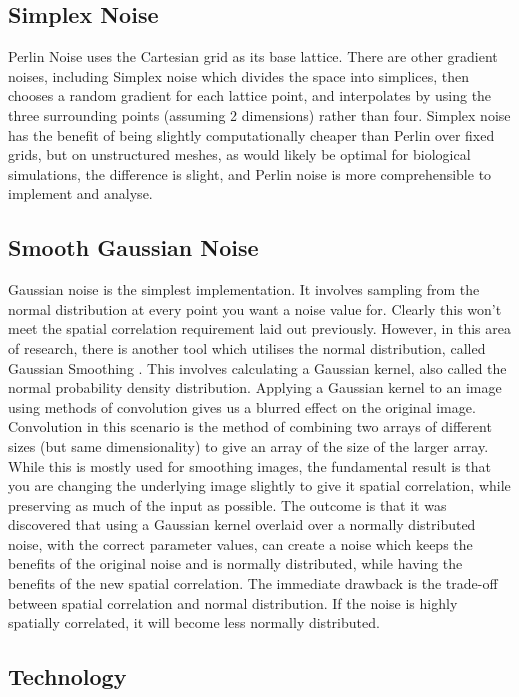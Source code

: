 \documentclass[11pt,a4paper]{article}
\begin{document}
\subsection{Simplex Noise}

Perlin Noise uses the Cartesian grid as its base lattice. There are other gradient noises, including Simplex noise \cite{clouds} which divides the space into simplices, then chooses a random gradient for each lattice point, and interpolates by using the three surrounding points (assuming 2 dimensions) rather than four. Simplex noise has the benefit of being slightly computationally cheaper than Perlin over fixed grids, but on unstructured meshes, as would likely be optimal for biological simulations, the difference is slight, and Perlin noise is more comprehensible to implement and analyse.

\subsection{Smooth Gaussian Noise}

Gaussian noise is the simplest implementation. It involves sampling from the normal distribution at every point you want a noise value for. Clearly this won't meet the spatial correlation requirement laid out previously. However, in this area of research, there is another tool which utilises the normal distribution, called Gaussian Smoothing \cite{kernelsmoothing}. This involves calculating a Gaussian kernel, also called the normal probability density distribution. Applying a Gaussian kernel to an image using methods of convolution gives us a blurred effect on the original image. Convolution in this scenario is the method of combining two arrays of different sizes (but same dimensionality) to give an array of the size of the larger array. While this is mostly used for smoothing images, the fundamental result is that you are changing the underlying image slightly to give it spatial correlation, while preserving as much of the input as possible. The outcome is that it was discovered that using a Gaussian kernel overlaid over a normally distributed noise, with the correct parameter values, can create a noise which keeps the benefits of the original noise and is normally distributed, while having the benefits of the new spatial correlation. The immediate drawback is the trade-off between spatial correlation and normal distribution. If the noise is highly spatially correlated, it will become less normally distributed.

\subsection{Technology}
\end{document}
